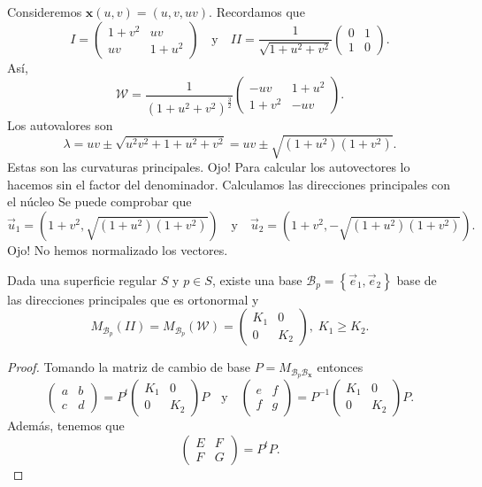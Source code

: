 \begin{eg}
Consideremos $\displaystyle \textbf{x} \left(u,v\right)=\left(u,v, uv\right) $. Recordamos que 
\[ I = \begin{pmatrix} 1 + v^{2} & uv \\ uv & 1 + u^{2} \end{pmatrix} \quad \text{y} \quad II = \frac{1}{\sqrt{1+u^{2}+v^{2}}}\begin{pmatrix} 0 & 1 \\ 1 & 0 \end{pmatrix} .\]
Así, 
\[\mathcal{W}=\frac{1}{\left(1 + u^{2}+v^{2}\right)^{\frac{3}{2}}}\begin{pmatrix} -uv & 1 + u^{2} \\ 1 + v^{2} & -uv \end{pmatrix} .\]
Los autovalores son
\[\lambda = uv \pm \sqrt{u^{2}v^{2}+1+u^{2}+v^{2}}=uv \pm \sqrt{\left(1 + u^{2}\right)\left(1 + v^{2}\right)} .\]
Estas son las curvaturas principales. Ojo! Para calcular los autovectores lo hacemos sin el factor del denominador. Calculamos las direcciones principales con el núcleo
Se puede comprobar que 
\[\vec{u}_{1}=\left(1 + v^{2}, \sqrt{\left(1 + u^{2}\right)\left(1 + v^{2}\right)}\right) \quad \text{y} \quad \vec{u}_{2}=\left(1 + v^{2}, -\sqrt{\left(1 + u^{2}\right)\left(1 + v^{2}\right)}\right) .\]
Ojo! No hemos normalizado los vectores.
\end{eg}
\begin{theorem}
	Dada una superficie regular $\displaystyle S $ y $\displaystyle p \in S $, existe una base $\displaystyle \mathcal{B}_{p} = \left\{ \vec{e}_{1}, \vec{e}_{2}\right\}  $ base de las direcciones principales que es ortonormal y 
	\[M_{ \mathcal{B}_{p}}\left(II\right)=M_{\mathcal{B}_{p}}\left(\mathcal{W}\right)=\begin{pmatrix} K_{1} & 0 \\ 0 & K_{2} \end{pmatrix}, \; K_{1} \geq K_{2} .\]
\end{theorem}
\begin{proof}
Tomando la matriz de cambio de base $\displaystyle P = M_{ \mathcal{B}_{p}\mathcal{B}_{ \textbf{x} }} $ entonces
\[\begin{pmatrix} a & b \\ c & d \end{pmatrix}=P^{t}\begin{pmatrix} K_{1} & 0 \\ 0 & K_{2} \end{pmatrix}P \quad \text{y} \quad \begin{pmatrix} e & f \\ f & g \end{pmatrix}=P^{-1}\begin{pmatrix} K_{1} & 0 \\ 0 & K_{2} \end{pmatrix}P .\]
Además, tenemos que 
\[\begin{pmatrix} E & F \\ F & G \end{pmatrix}=P^{t}P .\]
\end{proof}

